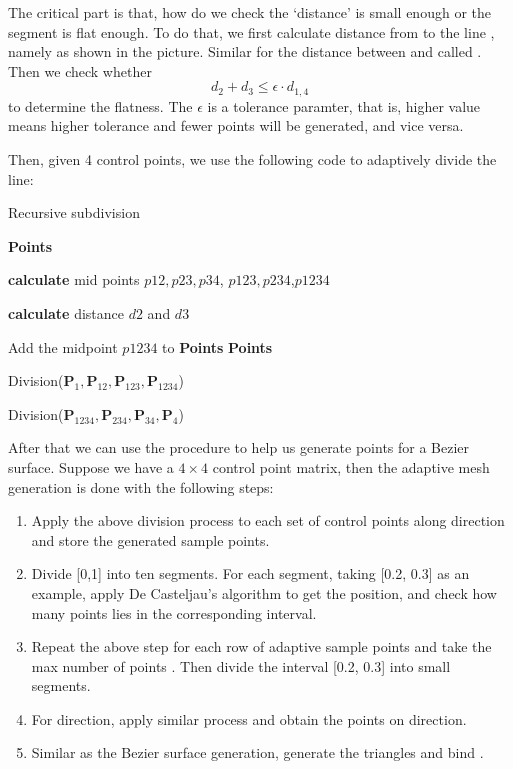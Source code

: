 \documentclass[acmtog]{acmart}
\newcommand{\code}[1]{\texttt{\color{magenta}{#1}}} %
\begin{document}
The critical part is that, how do we check the `distance' is small enough or the segment is flat enough. To do that, we first calculate distance from \code{p2} to the line \code{p1p4}, namely \code{d2} as shown in the picture. Similar for the distance between \code{d3} and \code{p1p4} called \code{d3}. Then we check whether \[
	d_2 + d_3 \leq \epsilon \cdot d_{1,4}	
\]
to determine the flatness. The $\epsilon$ is a tolerance paramter, that is, higher value means higher tolerance and fewer points will be generated, and vice versa. 

Then, given 4 control points, we use the following code to adaptively divide the line: 


\begin{algorithm}
	\caption{Recursive subdivision}
	\begin{algorithmic}[1]
		 
			\State \Return \textbf{Points}
		\EndIf

		\State \textbf{calculate} mid points $p12, p23, p34$, $p123, p234$,$p1234$

		\State \textbf{calculate} distance $d2$ and $d3$

			\State Add the midpoint $p1234$ to \textbf{Points}
			\State \Return \textbf{Points}
		\EndIf

		\State Division($\bm{P}_1, \bm{P}_{12}, \bm{P}_{123}, \bm{P}_{1234}$)

		\State Division($\bm{P}_{1234}, \bm{P}_{234}, \bm{P}_{34}, \bm{P}_4$)

		\EndProcedure
	\end{algorithmic}
\end{algorithm}


After that we can use the procedure to help us generate points for a Bezier surface. Suppose we have a $4\times 4$ control point matrix, then the adaptive mesh generation is done with the following steps: 

\begin{enumerate}
	\item Apply the above division process to each set of control points along \code{u} direction and store the generated sample points. 
	\item Divide [0,1] into ten segments. For each segment, taking [0.2, 0.3] as an example, apply De Casteljau's algorithm to get the position, and check how many points lies in the corresponding interval.
	\item Repeat the above step for each row of adaptive sample points and take the max number of points \code{n}. Then divide the interval [0.2, 0.3] into \code{n} small segments.
	\item For \code{v} direction, apply similar process and obtain the points on \code{v} direction.
	\item Similar as the Bezier surface generation, generate the triangles and bind \code{VAO, VBO, EBO}.
\end{enumerate}
\end{document}
